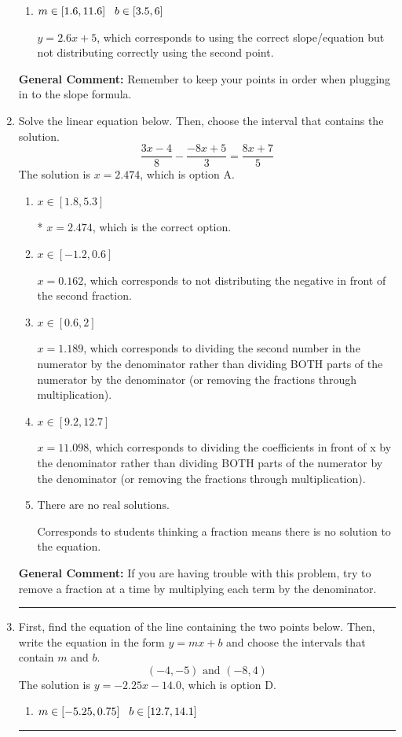 \documentclass{extbook}[14pt]
\newcommand{\litem}[1]{\item #1

\rule{\textwidth}{0.4pt}}
\begin{document}
\begin{enumerate}
{\begin{enumerate}[label=\Alph*.]
* $y = 2.6x + 16.2$, which is the correct option.
\item \( m \in [1.6, 11.6] \hspace*{3mm} b \in [3.5, 6] \)

 $y = 2.6x + 5$, which corresponds to using the correct slope/equation but not distributing correctly using the second point.
\end{enumerate}

\textbf{General Comment:} Remember to keep your points in order when plugging in to the slope formula.
}
\litem{
Solve the linear equation below. Then, choose the interval that contains the solution.
\[ \frac{3x -4}{8} - \frac{-8x + 5}{3} = \frac{8x + 7}{5} \]The solution is \( x = 2.474 \), which is option A.\begin{enumerate}[label=\Alph*.]
\item \( x \in [1.8, 5.3] \)

* $x = 2.474$, which is the correct option.
\item \( x \in [-1.2, 0.6] \)

 $x = 0.162$, which corresponds to not distributing the negative in front of the second fraction.
\item \( x \in [0.6, 2] \)

 $x = 1.189$, which corresponds to dividing the second number in the numerator by the denominator rather than dividing BOTH parts of the numerator by the denominator (or removing the fractions through multiplication).
\item \( x \in [9.2, 12.7] \)

 $x = 11.098$, which corresponds to dividing the coefficients in front of x by the denominator rather than dividing BOTH parts of the numerator by the denominator (or removing the fractions through multiplication).
\item \( \text{There are no real solutions.} \)

Corresponds to students thinking a fraction means there is no solution to the equation.
\end{enumerate}

\textbf{General Comment:} If you are having trouble with this problem, try to remove a fraction at a time by multiplying each term by the denominator.
}
\litem{
First, find the equation of the line containing the two points below. Then, write the equation in the form $ y=mx+b $ and choose the intervals that contain $m$ and $b$.
\[ (-4, -5) \text{ and } (-8, 4) \]The solution is \( y = -2.25x -14.0 \), which is option D.\begin{enumerate}[label=\Alph*.]
\item \( m \in [-5.25, 0.75] \hspace*{3mm} b \in [12.7, 14.1] \)


\end{enumerate}}
\end{enumerate}
\end{document}
